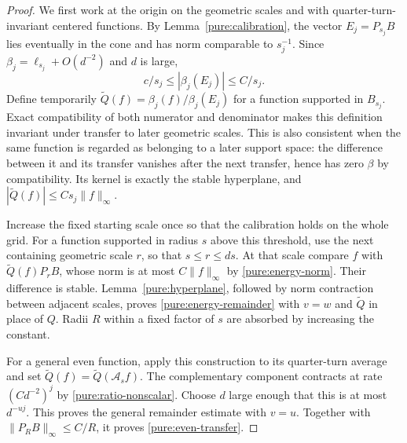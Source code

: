 \begin{proof}
We first work at the origin on the geometric scales and with
quarter-turn-invariant centered functions.  By
Lemma~\ref{pure:calibration}, the vector $E_j=P_{s_j}B$ lies eventually
in the cone and has norm comparable to $s_j^{-1}$.  Since
$\beta_j=\ell_{s_j}+O(d^{-2})$ and $d$ is large,
\[
 c/s_j\leq|\beta_j(E_j)|\leq C/s_j.
\]
Define temporarily
$\widetilde Q(f)=\beta_j(f)/\beta_j(E_j)$ for a function supported in
$B_{s_j}$.  Exact compatibility of both numerator and denominator makes
this definition invariant under transfer to later geometric scales.
This is also consistent when the same function is regarded as belonging
to a later support space: the difference between it and its transfer
vanishes after the next transfer, hence has zero $\beta$ by compatibility.
Its kernel is exactly the stable hyperplane, and
$|\widetilde Q(f)|\leq Cs_j\|f\|_\infty$.

Increase the fixed starting scale once so that the calibration holds on
the whole grid.  For a function supported in radius $s$ above this
threshold, use the next containing geometric scale $r$, so that
$s\leq r\leq ds$.  At that scale compare $f$ with
$\widetilde Q(f)P_rB$, whose norm is at most $C\|f\|_\infty$ by
\eqref{pure:energy-norm}.  Their difference is stable.
Lemma~\ref{pure:hyperplane}, followed by norm contraction between adjacent
scales, proves \eqref{pure:energy-remainder} with $v=w$ and
$\widetilde Q$ in place of $Q$.  Radii $R$ within a fixed factor of $s$
are absorbed by increasing the constant.

For a general even function, apply this construction to its quarter-turn
average and set $\widetilde Q(f)=\widetilde Q(\mathcal A_s f)$.
The complementary component contracts at rate $(Cd^{-2})^j$ by
\eqref{pure:ratio-nonscalar}.  Choose $d$ large enough that this is at
most $d^{-uj}$.  This proves the general remainder estimate with $v=u$.
Together with $\|P_RB\|_\infty\leq C/R$, it proves
\eqref{pure:even-transfer}.


\end{proof}
